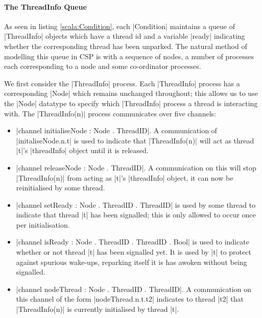 


\paragraph{The ThreadInfo Queue}\label{section:ThreadInfo}

As seen in listing \ref{scala:Condition}, each |Condition| maintains a queue of |ThreadInfo| objects which have a thread id and a variable |ready| indicating whether the corresponding thread has been unparked. The natural method of modelling this queue in CSP is with a sequence of nodes, a number of processes each corresponding to a node  and some co-ordinator processes.

We first consider the |ThreadInfo| process. Each |ThreadInfo| process has a corresponding |Node| which remains unchanged throughout; this allows us to use the |Node| datatype to specify which |ThreadInfo| process a thread is interacting with. The |ThreadInfo(n)| process communicates over five channels:

\begin{itemize}
  \item |channel initialiseNode : Node . ThreadID|. A communication of |initaliseNode.n.t| is used to indicate that |ThreadInfo(n)| will act as thread |t|'s |threadInfo| object until it is released.
  \item |channel releaseNode : Node . ThreadID|. A communication on this will stop |ThreadInfo(n)| from acting as |t|'s |threadInfo| object, it can now be reinitialised by some thread.
  \item |channel setReady : Node . ThreadID . ThreadID| is used by some thread to indicate that thread |t| has been signalled; this is only allowed to occur once per initialisation.
  \item |channel isReady : Node . ThreadID . ThreadID . Bool| is used to indicate whether or not thread |t| has been signalled yet. It is used by |t| to protect against spurious wake-ups, reparking itself it is has awoken without being signalled.
  \item |channel nodeThread : Node . ThreadID . ThreadID|. A communication on this channel of the form |nodeThread.n.t.t2| indicates to thread |t2| that |ThreadInfo(n)| is currently initialised by thread |t|.
\end{itemize}

